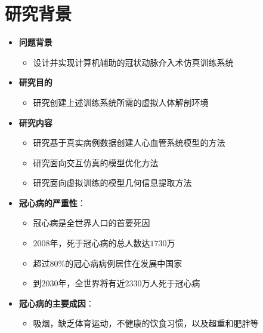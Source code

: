 \section{研究背景}

\begin{frame}
\begin{itemize}
\item \textbf{问题背景}
\begin{itemize}
\item 设计并实现计算机辅助的冠状动脉介入术仿真训练系统
\end{itemize}
\end{itemize}
\begin{itemize}
\item \textbf{研究目的}
\begin{itemize}
\item 研究创建上述训练系统所需的虚拟人体解剖环境
\end{itemize}
\end{itemize}
\begin{itemize}
\item \textbf{研究内容}
\begin{itemize}
\item 研究基于真实病例数据创建人心血管系统模型的方法
\item 研究面向交互仿真的模型优化方法
\item 研究面向虚拟训练的模型几何信息提取方法
\end{itemize}
\end{itemize}
\end{frame}

\begin{frame}
\begin{itemize}
\item \textbf{冠心病的严重性}：
\begin{itemize}
\item 冠心病是全世界人口的首要死因
\item $2008$年，死于冠心病的总人数达$1730$万
\item 超过$80 \%$的冠心病病例居住在发展中国家
\item 到$2030$年，全世界将有近$2330$万人死于冠心病
\end{itemize}
\end{itemize}
\begin{itemize}
\item \textbf{冠心病的主要成因}：
\begin{itemize}
\item 吸烟，缺乏体育运动，不健康的饮食习惯，以及超重和肥胖等
\end{itemize}
\end{itemize}
\end{frame}

